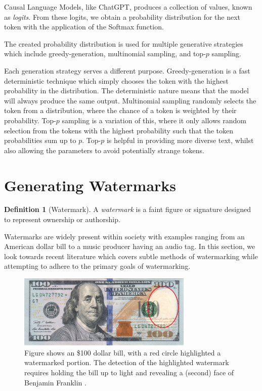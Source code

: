 \documentclass{l4proj}
\theoremstyle{definition}
\newtheorem{definition}{Definition}[section]
\begin{document}
        Causal Language Models, like ChatGPT, produces a collection of values, known as \emph{logits}. From these logits, we obtain a probability distribution for the next token with the application of the Softmax function.

        The created probability distribution is used for multiple generative strategies which include greedy-generation, multinomial sampling, and top-$p$ sampling.

        Each generation strategy serves a different purpose. Greedy-generation is a fast deterministic technique which simply chooses the token with the highest probability in the distribution. The deterministic nature means that the model will always produce the same output. Multinomial sampling randomly selects the token from a distribution, where the chance of a token is weighted by their probability. Top-$p$ sampling is a variation of this, where it only allows random selection from the tokens with the highest probability such that the token probabilities sum up to $p$. Top-$p$ is helpful in providing more diverse text, whilst also allowing the parameters to avoid potentially strange tokens.

\section{Generating Watermarks}
    \begin{definition}[Watermark]
        A \emph{watermark} is a faint figure or signature designed to represent ownership or authorship.
    \end{definition}

    Watermarks are widely present within society with examples ranging from an American dollar bill to a music producer having an audio tag. In this section, we look towards recent literature which covers subtle methods of watermarking while attempting to adhere to the primary goals of watermarking.

    \begin{figure}[ht]
        \centering
        \includegraphics[height=3.5cm, width=1\linewidth, keepaspectratio]{images/background/dbill-highlighted.png}
        \caption{Figure shows an \$100 dollar bill, with a red circle highlighted a watermarked portion. The detection of the highlighted watermark requires holding the bill up to light and revealing a (second) face of Benjamin Franklin \citep{bep2013dollar}.}
         \label{fig:dbill-watermark} 
    \end{figure}
         
\end{document}

